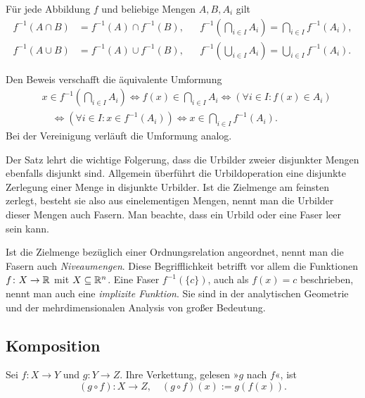 \begin{Satz}
Für jede Abbildung $f$ und beliebige Mengen $A,B,A_i$ gilt
\begin{align*}
f^{-1}(A\cap B) &= f^{-1}(A)\cap f^{-1}(B), &&\textstyle
f^{-1}(\bigcap_{i\in I} A_i) = \bigcap_{i\in I} f^{-1}(A_i),\\
f^{-1}(A\cup B) &= f^{-1}(A)\cup f^{-1}(B), &&\textstyle
f^{-1}(\bigcup_{i\in I} A_i) = \bigcup_{i\in I} f^{-1}(A_i).
\end{align*}
\end{Satz}
\begin{Beweis}
Den Beweis verschafft die äquivalente Umformung
\begin{align*}
&\textstyle x\in f^{-1}(\bigcap_{i\in I} A_i)
\iff f(x)\in\bigcap_{i\in I} A_i
\iff (\forall i\in I\colon f(x)\in A_i)\\
&\textstyle\quad\iff (\forall i\in I\colon x\in f^{-1}(A_i))
\iff x\in\bigcap_{i\in I} f^{-1}(A_i).
\end{align*}
Bei der Vereinigung verläuft die Umformung analog.\,\qedsymbol
\end{Beweis}

\noindent
Der Satz lehrt die wichtige Folgerung, dass die Urbilder zweier
disjunkter Mengen ebenfalls disjunkt sind. Allgemein überführt die
Urbildoperation eine disjunkte Zerlegung einer Menge in disjunkte
Urbilder. Ist die Zielmenge am feinsten zerlegt, besteht sie also
aus einelementigen Mengen, nennt man die Urbilder dieser Mengen
auch Fasern. Man beachte, dass ein Urbild oder eine Faser leer
sein kann.

Ist die Zielmenge bezüglich einer Ordnungsrelation angeordnet,
nennt man die Fasern auch \emph{Niveaumengen}.
Diese Begrifflichkeit betrifft vor allem die Funktionen $f\colon X\to\mathbb R$
mit $X\subseteq\mathbb R^n$. Eine Faser $f^{-1}(\{c\})$, auch als $f(x)=c$
beschrieben, nennt man auch eine \emph{implizite Funktion}. Sie sind
in der analytischen Geometrie und der mehrdimensionalen Analysis von
großer Bedeutung.

\subsection{Komposition}

\begin{Definition}[Komposition]\newlinefirst
Sei $f\colon X\to Y$ und $g\colon Y\to Z$. Ihre
Verkettung,
gelesen »$g$ nach $f$«, ist%
\[(g\circ f)\colon X\to Z,\quad (g\circ f)(x):=g(f(x)).\]
\end{Definition}

